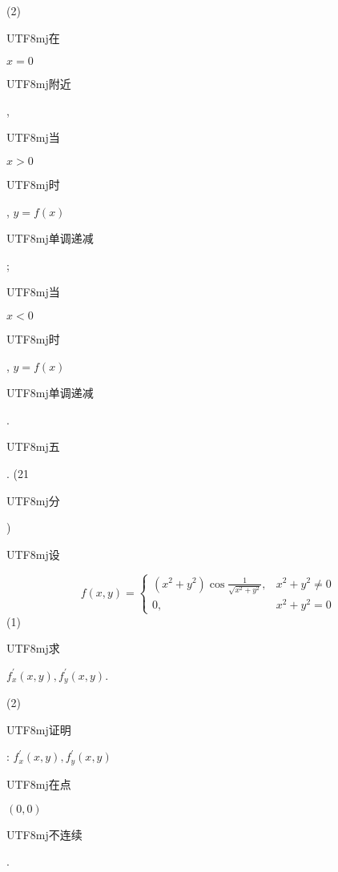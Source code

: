 \documentclass[10pt]{article}
\begin{document}
(2) \begin{CJK}{UTF8}{mj}在\end{CJK} $x=0$ \begin{CJK}{UTF8}{mj}附近\end{CJK}, \begin{CJK}{UTF8}{mj}当\end{CJK} $x>0$ \begin{CJK}{UTF8}{mj}时\end{CJK}, $y=f(x)$ \begin{CJK}{UTF8}{mj}单调递减\end{CJK}; \begin{CJK}{UTF8}{mj}当\end{CJK} $x<0$ \begin{CJK}{UTF8}{mj}时\end{CJK}, $y=f(x)$ \begin{CJK}{UTF8}{mj}单调递减\end{CJK}.

\begin{CJK}{UTF8}{mj}五\end{CJK}. (21 \begin{CJK}{UTF8}{mj}分\end{CJK}) \begin{CJK}{UTF8}{mj}设\end{CJK}
$$
f(x, y)= \begin{cases}\left(x^{2}+y^{2}\right) \cos \frac{1}{\sqrt{x^{2}+y^{2}}}, & x^{2}+y^{2} \neq 0 \\ 0, & x^{2}+y^{2}=0\end{cases}
$$
(1) \begin{CJK}{UTF8}{mj}求\end{CJK} $f_{x}^{\prime}(x, y), f_{y}^{\prime}(x, y)$.

(2) \begin{CJK}{UTF8}{mj}证明\end{CJK}: $f_{x}^{\prime}(x, y), f_{y}^{\prime}(x, y)$ \begin{CJK}{UTF8}{mj}在点\end{CJK} $(0,0)$ \begin{CJK}{UTF8}{mj}不连续\end{CJK}.
\end{document}
